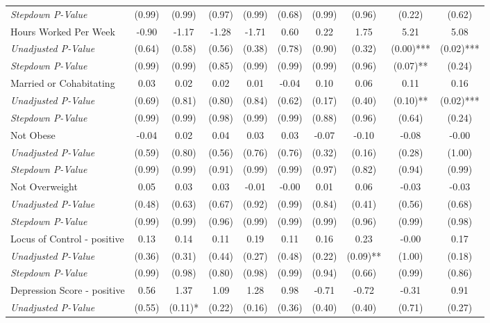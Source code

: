 \begin{tabular}{l c c c c c c c c c}
\quad \textit{Stepdown P-Value} & (0.99) & (0.99) & (0.97) & (0.99) & (0.68) & (0.99) & (0.96) & (0.22) & (0.62) \\
Hours Worked Per Week & -0.90 & -1.17 & -1.28 & -1.71 & 0.60 & 0.22 & 1.75 & 5.21 & 5.08 \\
\quad \textit{Unadjusted P-Value} & (0.64) & (0.58) & (0.56) & (0.38) & (0.78) & (0.90) & (0.32) & (0.00)*** & (0.02)*** \\
\quad \textit{Stepdown P-Value} & (0.99) & (0.99) & (0.85) & (0.99) & (0.99) & (0.99) & (0.96) & (0.07)** & (0.24) \\
Married or Cohabitating & 0.03 & 0.02 & 0.02 & 0.01 & -0.04 & 0.10 & 0.06 & 0.11 & 0.16 \\
\quad \textit{Unadjusted P-Value} & (0.69) & (0.81) & (0.80) & (0.84) & (0.62) & (0.17) & (0.40) & (0.10)** & (0.02)*** \\
\quad \textit{Stepdown P-Value} & (0.99) & (0.99) & (0.98) & (0.99) & (0.99) & (0.88) & (0.96) & (0.64) & (0.24) \\
Not Obese & -0.04 & 0.02 & 0.04 & 0.03 & 0.03 & -0.07 & -0.10 & -0.08 & -0.00 \\
\quad \textit{Unadjusted P-Value} & (0.59) & (0.80) & (0.56) & (0.76) & (0.76) & (0.32) & (0.16) & (0.28) & (1.00) \\
\quad \textit{Stepdown P-Value} & (0.99) & (0.99) & (0.91) & (0.99) & (0.99) & (0.97) & (0.82) & (0.94) & (0.99) \\
Not Overweight & 0.05 & 0.03 & 0.03 & -0.01 & -0.00 & 0.01 & 0.06 & -0.03 & -0.03 \\
\quad \textit{Unadjusted P-Value} & (0.48) & (0.63) & (0.67) & (0.92) & (0.99) & (0.84) & (0.41) & (0.56) & (0.68) \\
\quad \textit{Stepdown P-Value} & (0.99) & (0.99) & (0.96) & (0.99) & (0.99) & (0.99) & (0.96) & (0.99) & (0.98) \\
Locus of Control - positive & 0.13 & 0.14 & 0.11 & 0.19 & 0.11 & 0.16 & 0.23 & -0.00 & 0.17 \\
\quad \textit{Unadjusted P-Value} & (0.36) & (0.31) & (0.44) & (0.27) & (0.48) & (0.22) & (0.09)** & (1.00) & (0.18) \\
\quad \textit{Stepdown P-Value} & (0.99) & (0.98) & (0.80) & (0.98) & (0.99) & (0.94) & (0.66) & (0.99) & (0.86) \\
Depression Score - positive & 0.56 & 1.37 & 1.09 & 1.28 & 0.98 & -0.71 & -0.72 & -0.31 & 0.91 \\
\quad \textit{Unadjusted P-Value} & (0.55) & (0.11)* & (0.22) & (0.16) & (0.36) & (0.40) & (0.40) & (0.71) & (0.27) \\

\end{tabular}
